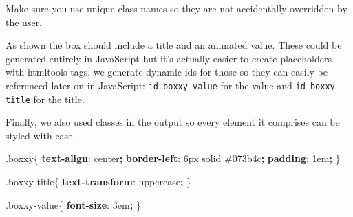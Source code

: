 \documentclass[
  10pt,
]{krantz}
\makeatletter
\newenvironment{Shaded}{\begin{snugshade}}{\end{snugshade}}
\newcommand{\CommentTok}[1]{\textcolor[rgb]{0.37,0.37,0.37}{\textit{#1}}}
\newcommand{\ConstantTok}[1]{\textcolor[rgb]{0,0,0}{#1}}
\newcommand{\ControlFlowTok}[1]{\textcolor[rgb]{0.27,0.27,0.27}{\textbf{#1}}}
\newcommand{\DataTypeTok}[1]{\textcolor[rgb]{0.27,0.27,0.27}{#1}}
\newcommand{\DecValTok}[1]{\textcolor[rgb]{0.06,0.06,0.06}{#1}}
\newcommand{\FunctionTok}[1]{\textcolor[rgb]{0,0,0}{#1}}
\newcommand{\KeywordTok}[1]{\textcolor[rgb]{0.27,0.27,0.27}{\textbf{#1}}}
\newcommand{\NormalTok}[1]{#1}
\newcommand{\OperatorTok}[1]{\textcolor[rgb]{0.43,0.43,0.43}{\textbf{#1}}}
\newcommand{\StringTok}[1]{\textcolor[rgb]{0.5,0.5,0.5}{#1}}
\newenvironment{kframe}{%
\medskip{}
\setlength{\fboxsep}{.8em}
 \def\at@end@of@kframe{}%
 \ifinner\ifhmode%
  \def\at@end@of@kframe{\end{minipage}}%
  \begin{minipage}{\columnwidth}%
 \fi\fi%
 \def\FrameCommand##1{\hskip\@totalleftmargin \hskip-\fboxsep
 \colorbox{shadecolor}{##1}\hskip-\fboxsep
     \hskip-\linewidth \hskip-\@totalleftmargin \hskip\columnwidth}%
 \MakeFramed {\advance\hsize-\width
   \@totalleftmargin\z@ \linewidth\hsize
   \@setminipage}}%
 {\par\unskip\endMakeFramed%
 \at@end@of@kframe}
\renewenvironment{Shaded}{\begin{kframe}}{\end{kframe}}
\newenvironment{rmdblock}[1]
  {
  \begin{itemize}
  \renewcommand{\labelitemi}{
    \raisebox{-.7\height}[0pt][0pt]{
      {\setkeys{Gin}{width=3em,keepaspectratio}\texttt{[image: images/\#1]}}
    }
  }
  \setlength{\fboxsep}{1em}
  \begin{kframe}
  \item
  }
  {
  \end{kframe}
  \end{itemize}
  }
\newenvironment{rmdnote}
  {\begin{rmdblock}{note}}
  {\end{rmdblock}}
\makeatother
\begin{document}
\begin{rmdnote}
Make sure you use unique class names so they are not accidentally
overridden by the user.
\end{rmdnote}

As shown the box should include a title and an animated value. These could be generated entirely in JavaScript but it's actually easier to create placeholders with htmltools tags, we generate dynamic ids for those so they can easily be referenced later on in JavaScript: \texttt{id-boxxy-value} for the value and \texttt{id-boxxy-title} for the title.

\begin{Shaded}
\end{Shaded}

Finally, we also used classes in the output so every element it comprises can be styled with ease.

\begin{Shaded}
\begin{Highlighting}[]
\FunctionTok{.boxxy}\NormalTok{\{}
  \KeywordTok{text{-}align}\NormalTok{: }\DecValTok{center}\OperatorTok{;}
  \KeywordTok{border{-}left}\NormalTok{: }\DecValTok{6}\DataTypeTok{px} \DecValTok{solid} \ConstantTok{\#073b4c}\OperatorTok{;}
  \KeywordTok{padding}\NormalTok{: }\DecValTok{1}\DataTypeTok{em}\OperatorTok{;}
\NormalTok{\}}

\FunctionTok{.boxxy{-}title}\NormalTok{\{}
  \KeywordTok{text{-}transform}\NormalTok{: }\DecValTok{uppercase}\OperatorTok{;}
\NormalTok{\}}

\FunctionTok{.boxxy{-}value}\NormalTok{\{}
  \KeywordTok{font{-}size}\NormalTok{: }\DecValTok{3}\DataTypeTok{em}\OperatorTok{;}
\NormalTok{\}}
\end{Highlighting}
\end{Shaded}
\end{document}
